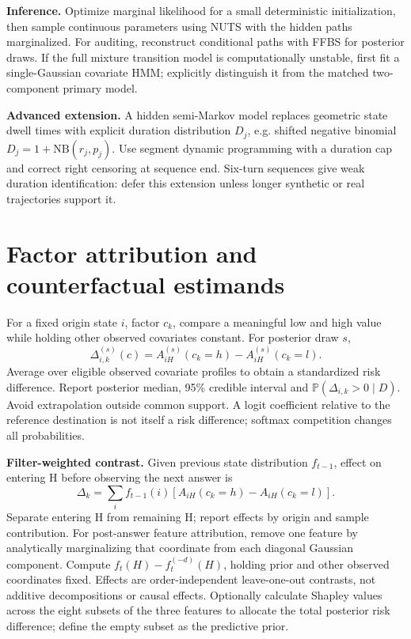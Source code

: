 \documentclass[11pt,letterpaper]{article}
\newcommand{\Prob}{\mathbb P}
\newcommand{\sectionpage}[1]{\clearpage\section{#1}}
\begin{document}
\textbf{Inference.} Optimize marginal likelihood for a small deterministic initialization, then sample continuous parameters using NUTS with the hidden paths marginalized. For auditing, reconstruct conditional paths with FFBS for posterior draws. If the full mixture transition model is computationally unstable, first fit a single-Gaussian covariate HMM; explicitly distinguish it from the matched two-component primary model.

\textbf{Advanced extension.} A hidden semi-Markov model replaces geometric state dwell times with explicit duration distribution $D_j$, e.g. shifted negative binomial $D_j=1+\mathrm{NB}(r_j,p_j)$. Use segment dynamic programming with a duration cap and correct right censoring at sequence end. Six-turn sequences give weak duration identification: defer this extension unless longer synthetic or real trajectories support it.

\sectionpage{Factor attribution and counterfactual estimands}
For a fixed origin state $i$, factor $c_k$, compare a meaningful low and high value while holding other observed covariates constant. For posterior draw $s$,
\[
\Delta^{(s)}_{i,k}(c)=A^{(s)}_{iH}(c_{k}=h)-A^{(s)}_{iH}(c_k=l).
\]
Average over eligible observed covariate profiles to obtain a standardized risk difference. Report posterior median, 95\% credible interval and $\Prob(\Delta_{i,k}>0\mid D)$. Avoid extrapolation outside common support. A logit coefficient relative to the reference destination is not itself a risk difference; softmax competition changes all probabilities.

\textbf{Filter-weighted contrast.} Given previous state distribution $f_{t-1}$, effect on entering H before observing the next answer is
\[
\Delta_k=\sum_i f_{t-1}(i)[A_{iH}(c_k=h)-A_{iH}(c_k=l)].
\]
Separate entering H from remaining H; report effects by origin and sample contribution. For post-answer feature attribution, remove one feature by analytically marginalizing that coordinate from each diagonal Gaussian component. Compute $f_t(H)-f_t^{(-d)}(H)$, holding prior and other observed coordinates fixed. Effects are order-independent leave-one-out contrasts, not additive decompositions or causal effects. Optionally calculate Shapley values across the eight subsets of the three features to allocate the total posterior risk difference; define the empty subset as the predictive prior. 
\end{document}
